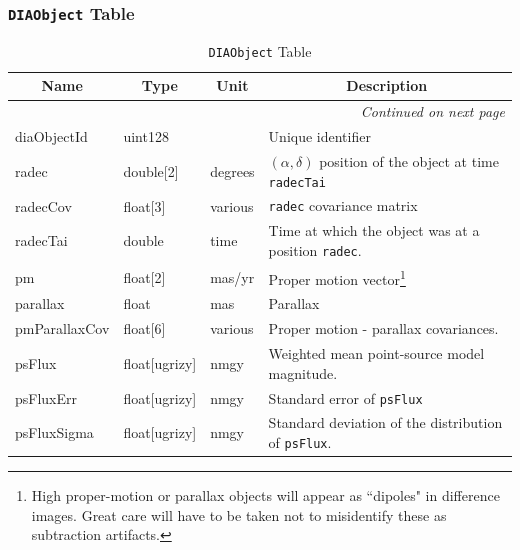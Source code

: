 \documentclass[12pt]{article}
\newcommand{\code}[1]{\texttt{#1}}
\newcommand{\DIAObject}{\code{DIAObject}\xspace}
\begin{document}
\subsubsection{\DIAObject Table}

\begin{center}
\begin{longtable}{p{3cm}p{2cm}p{2cm}p{5cm}}
\caption[\DIAObject Table]{\DIAObject Table} \\

\hline \multicolumn{1}{c}{\bf Name} & \multicolumn{1}{c}{\bf Type} & \multicolumn{1}{c}{\bf Unit} & \multicolumn{1}{c}{\bf Description} \\ \hline
\endhead

\hline \multicolumn{4}{r}{{\em Continued on next page}} \\
\endfoot

\hline\hline
\endlastfoot

diaObjectId & uint128 & ~ & Unique identifier \\ 

radec & double[2] & degrees & $(\alpha, \delta)$ position of the object at time \texttt{radecTai} \\ 

radecCov & float[3] & various & \texttt{radec} covariance matrix \\ 

radecTai & double & time & Time at which the object was at a position \texttt{radec}. \\ 

pm & float[2] & mas/yr & Proper motion vector\footnote{High proper-motion or parallax objects will appear as ``dipoles" in difference images. Great care will have to be taken not to misidentify these as subtraction artifacts.} \\ 

parallax & float & mas & Parallax \\ 

pmParallaxCov & float[6] & various & Proper motion - parallax covariances. \\ 

psFlux & float[ugrizy] & nmgy & Weighted mean point-source model magnitude. \\ 

psFluxErr & float[ugrizy] & nmgy & Standard error of {\tt psFlux}  \\ 

psFluxSigma & float[ugrizy] & nmgy & Standard deviation of the distribution of {\tt psFlux}. \\ 


\end{longtable}
\end{center}
\end{document}
